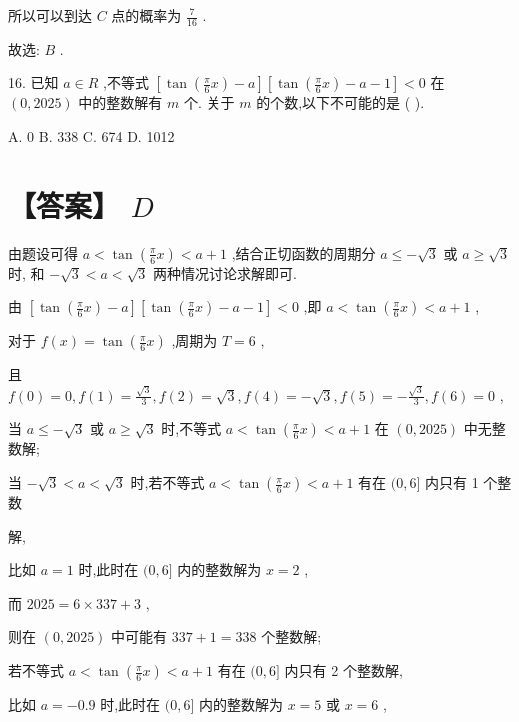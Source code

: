 \documentclass[10pt]{article}
\begin{document}
所以可以到达 \(C\) 点的概率为 \(\frac{7}{16}\) .

故选: \(B\) .

16. 已知 \(a \in  R\) ,不等式 \(\left\lbrack  {\tan \left( {\frac{\pi }{6}x}\right)  - a}\right\rbrack  \left\lbrack  {\tan \left( {\frac{\pi }{6}x}\right)  - a - 1}\right\rbrack   < 0\) 在 \(\left( {0,{2025}}\right)\) 中的整数解有 \(m\) 个. 关于 \(m\) 的个数,以下不可能的是 ( ).

A. 0 B. 338 C. 674 D. 1012

\section*{【答案】 \(D\)}

由题设可得 \(a < \tan \left( {\frac{\pi }{6}x}\right)  < a + 1\) ,结合正切函数的周期分 \(a \leq   - \sqrt{3}\) 或 \(a \geq  \sqrt{3}\) 时, 和 \(- \sqrt{3} < a < \sqrt{3}\) 两种情况讨论求解即可.

由 \(\left\lbrack  {\tan \left( {\frac{\pi }{6}x}\right)  - a}\right\rbrack  \left\lbrack  {\tan \left( {\frac{\pi }{6}x}\right)  - a - 1}\right\rbrack   < 0\) ,即 \(a < \tan \left( {\frac{\pi }{6}x}\right)  < a + 1\) ,

对于 \(f\left( x\right)  = \tan \left( {\frac{\pi }{6}x}\right)\) ,周期为 \(T = 6\) ,

且 \(f\left( 0\right)  = 0,f\left( 1\right)  = \frac{\sqrt{3}}{3},f\left( 2\right)  = \sqrt{3},f\left( 4\right)  =  - \sqrt{3},f\left( 5\right)  =  - \frac{\sqrt{3}}{3},f\left( 6\right)  = 0\) ,

当 \(a \leq   - \sqrt{3}\) 或 \(a \geq  \sqrt{3}\) 时,不等式 \(a < \tan \left( {\frac{\pi }{6}x}\right)  < a + 1\) 在 \(\left( {0,{2025}}\right)\) 中无整数解;

当 \(- \sqrt{3} < a < \sqrt{3}\) 时,若不等式 \(a < \tan \left( {\frac{\pi }{6}x}\right)  < a + 1\) 有在 \((0,6\rbrack\) 内只有 1 个整数

解,

比如 \(a = 1\) 时,此时在 \((0,6\rbrack\) 内的整数解为 \(x = 2\) ,

而 \({2025} = 6 \times  {337} + 3\) ,

则在 \(\left( {0,{2025}}\right)\) 中可能有 \({337} + 1 = {338}\) 个整数解;

若不等式 \(a < \tan \left( {\frac{\pi }{6}x}\right)  < a + 1\) 有在 \((0,6\rbrack\) 内只有 2 个整数解,

比如 \(a =  - {0.9}\) 时,此时在 \((0,6\rbrack\) 内的整数解为 \(x = 5\) 或 \(x = 6\) ,
\end{document}
